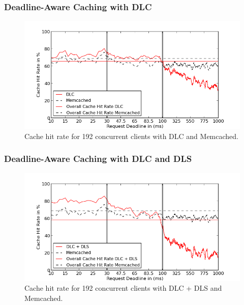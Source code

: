 \documentclass{beamer}
\begin{document}
\begin{frame}
  \frametitle{Deadline-Aware Caching with DLC}
  \begin{figure}[t]
    \begin{center}
      \centerline{\includegraphics[scale=0.5]{img/EC2/EC2_CS_MM/cache_48.png}}
      \caption{Cache hit rate for 192 concurrent clients with DLC and Memcached.}
      \label{fig:cache_192_cs_mm}
    \end{center}
  \end{figure}
\end{frame}

\begin{frame}
  \frametitle{Deadline-Aware Caching with DLC and DLS}
  \begin{figure}[t]
    \begin{center}
      \centerline{\includegraphics[scale=0.5]{img/EC2/EC2_SH_MM/cache_48.png}}
      \caption{Cache hit rate for 192 concurrent clients with DLC + DLS and Memcached.}
      \label{fig:cache_192_sh_mm}
    \end{center}
  \end{figure}
\end{frame}
\end{document}
